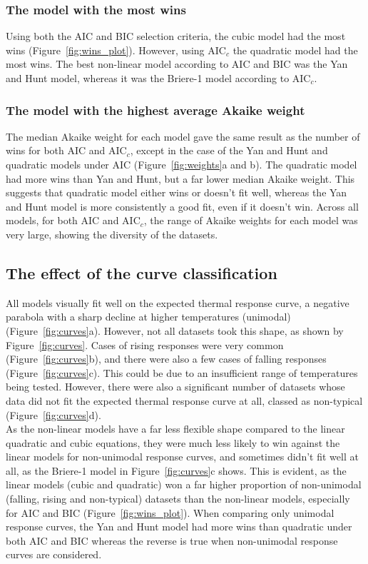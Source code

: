 \documentclass[11pt]{article}
\begin{document}
\subsubsection*{The model with the most wins}
Using both the AIC and BIC selection criteria, the cubic model had the most wins (Figure~\ref{fig:wins_plot}). However, using AIC$_c$ the quadratic model had the most wins. The best non-linear model according to AIC and BIC was the Yan and Hunt model, whereas it was the Briere-1 model according to AIC$_c$.

\subsubsection*{The model with the highest average Akaike weight}
The median Akaike weight for each model gave the same result as the number of wins for both AIC and AIC$_c$, except in the case of the Yan and Hunt and quadratic models under AIC (Figure~\ref{fig:weights}a and b). The quadratic model had more wins than Yan and Hunt, but a far lower median Akaike weight. This suggests that quadratic model either wins or doesn't fit well, whereas the Yan and Hunt model is more consistently a good fit, even if it doesn't win. Across all models, for both AIC and AIC$_c$, the range of Akaike weights for each model was very large, showing the diversity of the datasets.

\subsection{The effect of the curve classification}
All models visually fit well on the expected thermal response curve, a negative parabola with a sharp decline at higher temperatures (unimodal) (Figure~\ref{fig:curves}a). However, not all datasets took this shape, as shown by Figure~\ref{fig:curves}. Cases of rising responses were very common (Figure~\ref{fig:curves}b), and there were also a few cases of falling responses (Figure~\ref{fig:curves}c). This could be due to an insufficient range of temperatures being tested. However, there were also a significant number of datasets whose data did not fit the expected thermal response curve at all, classed as non-typical (Figure~\ref{fig:curves}d).
\\

As the non-linear models have a far less flexible shape compared to the linear quadratic and cubic equations, they were much less likely to win against the linear models for non-unimodal response curves, and sometimes didn't fit well at all, as the Briere-1 model in Figure~\ref{fig:curves}c shows. This is evident, as the linear models (cubic and quadratic) won a far higher proportion of non-unimodal (falling, rising and non-typical) datasets than the non-linear models, especially for AIC and BIC (Figure~\ref{fig:wins_plot}). When comparing only unimodal response curves, the Yan and Hunt model had more wins than quadratic under both AIC and BIC whereas the reverse is true when non-unimodal response curves are considered.
\end{document}
